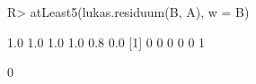 \begin{Schunk}
% --begin: "quant4"
\begin{Sinput}
R> atLeast5(lukas.residuum(B, A), w = B)
\end{Sinput}
\begin{Soutput}
[1] 1.0 1.0 1.0 1.0 0.8 0.0
[1] 0 0 0 0 0 1
\end{Soutput}
\begin{Soutput}
[1] 0
\end{Soutput}
%
% --end: "quant4"
\end{Schunk}
